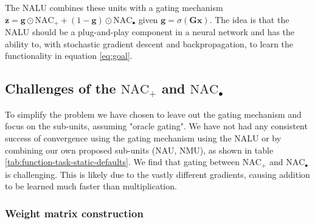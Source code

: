 The NALU combines these units with a gating mechanism $\mathbf{z} = \mathbf{g} \odot \text{NAC}_{+} + (1 - \mathbf{g}) \odot \text{NAC}_{\bullet}$ given $\mathbf{g} = \sigma(\mathbf{G} \mathbf{x})$. The idea is that the NALU should be a plug-and-play component in a neural network and has the ability to, with stochastic gradient descent and backpropagation, to learn the functionality in equation \ref{eq:goal}.

\subsection{Challenges of the $\text{NAC}_{+}$ and $\text{NAC}_{\bullet}$}
To simplify the problem we have chosen to leave out the gating mechanism and focus on the sub-units, assuming "oracle gating". We have not had any consistent success of convergence using the gating mechanism using the NALU or by combining our own proposed sub-units (NAU, NMU), as shown in table \ref{tab:function-task-static-defaults}. We find that gating between $\text{NAC}_{+}$ and $\text{NAC}_{\bullet}$ is challenging. This is likely due to the vastly different gradients, causing addition to be learned much faster than multiplication.





\subsubsection{Weight matrix construction}\label{sssec:weight}


